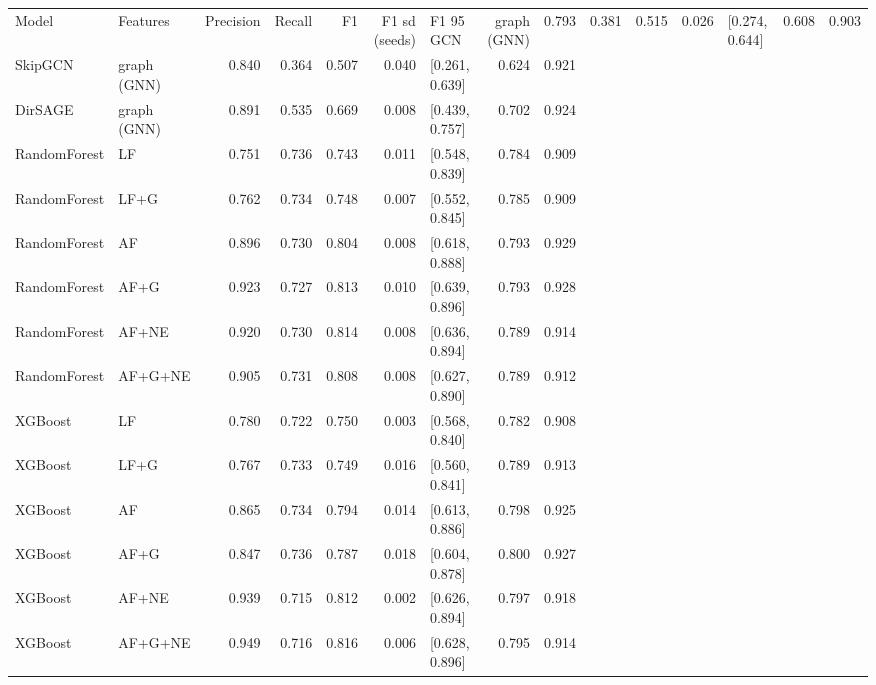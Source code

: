 \begin{tabular}{llrrrrlrr}
\toprule
Model & Features & Precision & Recall & F1 & F1 sd (seeds) & F1 95%
\midrule
GCN & graph (GNN) & 0.793 & 0.381 & 0.515 & 0.026 & [0.274, 0.644] & 0.608 & 0.903 \\
SkipGCN & graph (GNN) & 0.840 & 0.364 & 0.507 & 0.040 & [0.261, 0.639] & 0.624 & 0.921 \\
DirSAGE & graph (GNN) & 0.891 & 0.535 & 0.669 & 0.008 & [0.439, 0.757] & 0.702 & 0.924 \\
RandomForest & LF & 0.751 & 0.736 & 0.743 & 0.011 & [0.548, 0.839] & 0.784 & 0.909 \\
RandomForest & LF+G & 0.762 & 0.734 & 0.748 & 0.007 & [0.552, 0.845] & 0.785 & 0.909 \\
RandomForest & AF & 0.896 & 0.730 & 0.804 & 0.008 & [0.618, 0.888] & 0.793 & 0.929 \\
RandomForest & AF+G & 0.923 & 0.727 & 0.813 & 0.010 & [0.639, 0.896] & 0.793 & 0.928 \\
RandomForest & AF+NE & 0.920 & 0.730 & 0.814 & 0.008 & [0.636, 0.894] & 0.789 & 0.914 \\
RandomForest & AF+G+NE & 0.905 & 0.731 & 0.808 & 0.008 & [0.627, 0.890] & 0.789 & 0.912 \\
XGBoost & LF & 0.780 & 0.722 & 0.750 & 0.003 & [0.568, 0.840] & 0.782 & 0.908 \\
XGBoost & LF+G & 0.767 & 0.733 & 0.749 & 0.016 & [0.560, 0.841] & 0.789 & 0.913 \\
XGBoost & AF & 0.865 & 0.734 & 0.794 & 0.014 & [0.613, 0.886] & 0.798 & 0.925 \\
XGBoost & AF+G & 0.847 & 0.736 & 0.787 & 0.018 & [0.604, 0.878] & 0.800 & 0.927 \\
XGBoost & AF+NE & 0.939 & 0.715 & 0.812 & 0.002 & [0.626, 0.894] & 0.797 & 0.918 \\
XGBoost & AF+G+NE & 0.949 & 0.716 & 0.816 & 0.006 & [0.628, 0.896] & 0.795 & 0.914 \\
\bottomrule
\end{tabular}
